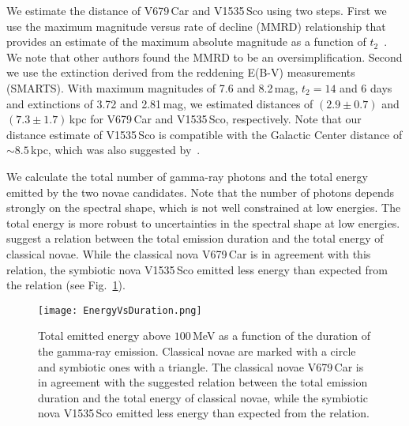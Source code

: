 \documentclass{aa} %
\begin{document}
We estimate the distance of V679\,Car and V1535\,Sco using two steps.
First we use the maximum magnitude versus rate of decline (MMRD) relationship that provides an estimate of the maximum absolute magnitude as a function of $t_2$~\citep{1995ApJ...452..704D,2000AJ....120.2007D}. We note that other authors \citep[e.g.][]{2011ApJ...735...94K} found the MMRD to be an oversimplification.
Second we use the extinction derived from the reddening E(B-V) measurements (SMARTS). With maximum magnitudes of 7.6 and 8.2\,mag, $t_2  = 14$ and $6$ days and extinctions of 3.72 and 2.81\,mag, we estimated distances of $(2.9 \pm 0.7)$ and $(7.3 \pm 1.7)$\,kpc for V679\,Car and V1535\,Sco, respectively. Note that our distance estimate of V1535\,Sco is compatible with the Galactic Center distance of $\sim8.5$\,kpc, which was also suggested by~\citet{2017ApJ...842...73L}.

We calculate the total number of gamma-ray photons and the total energy emitted by the two novae candidates. Note that the number of photons depends strongly on the spectral shape, which is not well constrained at low energies. The total energy is more robust to uncertainties in the spectral shape at low energies. \citet{2016ApJ...826..142C} suggest a relation between the total emission duration and the total energy of classical novae. While the classical nova V679\,Car is in agreement with this relation, the symbiotic nova V1535\,Sco emitted less energy than expected from the relation (see Fig.~\ref{fig:durationEnergy}).

\begin{figure}[htb!]
\begin{center}
\texttt{[image: EnergyVsDuration.png]}
\noindent
\caption{\small Total emitted energy above $100$\,MeV as a function of the duration of the gamma-ray emission. Classical novae are marked with a circle and symbiotic ones with a triangle. The classical novae V679\,Car is in agreement with the suggested relation between the total emission duration and the total energy of classical novae, while the symbiotic nova V1535\,Sco emitted less energy than expected from the relation. }
\label{fig:durationEnergy}
\end{center}
\end{figure}
\end{document}
